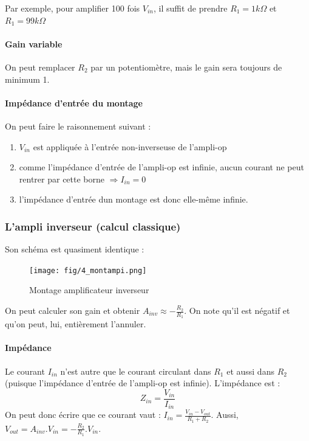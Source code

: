\documentclass[a4paper]{article}
\begin{document}
    Par exemple, pour amplifier 100 fois $V_{in}$, il suffit de prendre $R_1 = 1k\Omega$
    et $R_1 = 99k\Omega$

    \paragraph{Gain variable}
    On peut remplacer $R_2$ par un potentiomètre, mais le gain sera toujours de
    minimum 1.

    \paragraph{Impédance d'entrée du montage}
    On peut faire le raisonnement suivant :
    \begin{enumerate}
        \item $V_{in}$ est appliquée à l'entrée non-inverseuse de l'ampli-op
        \item comme l'impédance d'entrée de l'ampli-op est infinie, aucun courant
        ne peut rentrer par cette borne $\Rightarrow I_{in} = 0$
        \item l'impédance d'entrée dun montage est donc elle-même infinie.
    \end{enumerate}


    \subsubsection{L'ampli inverseur (calcul classique)}
    Son schéma est quasiment identique :
    \begin{figure}[H]
        \begin{center}
            \texttt{[image: fig/4\_montampi.png]}
            \caption{Montage amplificateur inverseur}
            \label{fig:4_montampi}
        \end{center}
    \end{figure}
    On peut calculer son gain et obtenir $A_{inv} \approx - \frac{R_2}{R_1}$. On 
    note qu'il est négatif et qu'on peut, lui, entièrement l'annuler.

    \paragraph{Impédance}
    Le courant $I_{in}$ n'est autre que le courant circulant dans $R_1$ et aussi
    dans $R_2$ (puisque l'impédance d'entrée de l'ampli-op est infinie). L'impédance est :
    $$ Z_{in} = \frac{V_{in}}{I_{in}}$$
    On peut donc écrire que ce courant vaut : $I_{in} = \frac{V_{in} - V_{out}}{R_1+R_2} $.
    Aussi, $V_{out} = A_{inv}.V_{in} = -\frac{R_2}{R_1}.V_{in} $.\\
\end{document}
